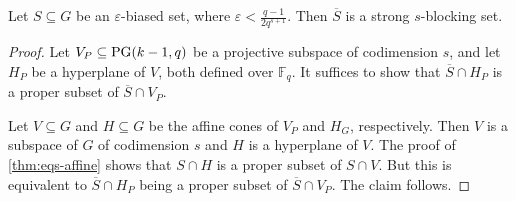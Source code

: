 \documentclass[11pt]{article}
\newcommand{\eps}{\varepsilon}
\newcommand{\F}{\mathbb{F}}
\DeclareMathOperator{\PG}{PG}
\begin{document}
\begin{theorem}
Let $S\subseteq G$ be an $\eps$-biased set, where $\eps<\frac{q-1}{2q^{s+1}}$. 
Then $\overline{S}$ is a strong $s$-blocking set.
\end{theorem}

\begin{proof}
Let $V_P\subseteq {\rm PG}(k-1,q)$ be a projective subspace of codimension $s$, and let $H_P$ be a hyperplane of $V$, both defined over $\F_q$. It suffices to show that $\overline{S}\cap H_P$ is a proper subset of $\overline{S}\cap V_P$.

Let $V\subseteq G$ and $H\subseteq G$ be the affine cones of $V_P$ and $H_G$, respectively. Then $V$ is a subspace of $G$ of codimension $s$ and $H$ is a hyperplane of $V$. The proof of \cref{thm:eqs-affine} shows that $S\cap H$ is a proper subset of $S\cap V$. But this is equivalent to  $\overline{S}\cap H_P$ being a proper subset of $\overline{S}\cap V_P$. The claim follows.
\end{proof}
\fi




\end{document}
